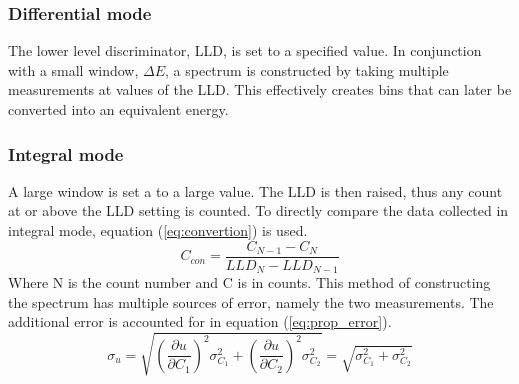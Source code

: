 \documentclass[..Spectroscopy.tex]{subfiles}
\begin{document}
	\subsubsection{Differential mode}
		The lower level discriminator, LLD, is set to a specified value. In conjunction with a small window, $\Delta E$, a spectrum is constructed by taking multiple measurements at values of the LLD. This effectively creates bins that can later be converted into an equivalent energy. 
	\subsubsection{Integral mode}
		A large window is set a to a large value. The LLD is then raised, thus any count at or above the LLD setting is counted. To directly compare the data collected in integral mode, equation (\ref{eq:convertion}) is used.
		\begin{equation}
			C_{con}=\frac{C_{N-1}-C_N}{LLD_{N}-LLD_{N-1}}
			\label{eq:convertion}
	\end{equation}
	Where N is the count number and C is in counts. This method of constructing the spectrum has multiple sources of error, namely the two measurements. The additional error is accounted for in equation (\ref{eq:prop_error}).\cite{mcgregor}
	\begin{equation}
		\sigma_u=\sqrt{\left(\frac{\partial{u}}{\partial{C_1}}\right)^2\sigma_{C_1}^2+\left(\frac{\partial{u}}{\partial{C_2}}\right)^2\sigma_{C_2}^2}=\sqrt{\sigma_{C_1}^2+\sigma_{C_2}^2}
	\label{eq:prop_error}
	\end{equation}
\end{document}
